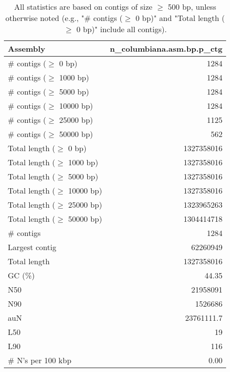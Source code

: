 \documentclass[12pt,a4paper]{article}
\begin{document}
\begin{table}[ht]
\begin{center}
\caption{All statistics are based on contigs of size $\geq$ 500 bp, unless otherwise noted (e.g., "\# contigs ($\geq$ 0 bp)" and "Total length ($\geq$ 0 bp)" include all contigs).}
\begin{tabular}{|l*{1}{|r}|}
\hline
Assembly & n\_columbiana.asm.bp.p\_ctg \\ \hline
\# contigs ($\geq$ 0 bp) & 1284 \\ \hline
\# contigs ($\geq$ 1000 bp) & 1284 \\ \hline
\# contigs ($\geq$ 5000 bp) & 1284 \\ \hline
\# contigs ($\geq$ 10000 bp) & 1284 \\ \hline
\# contigs ($\geq$ 25000 bp) & 1125 \\ \hline
\# contigs ($\geq$ 50000 bp) & 562 \\ \hline
Total length ($\geq$ 0 bp) & 1327358016 \\ \hline
Total length ($\geq$ 1000 bp) & 1327358016 \\ \hline
Total length ($\geq$ 5000 bp) & 1327358016 \\ \hline
Total length ($\geq$ 10000 bp) & 1327358016 \\ \hline
Total length ($\geq$ 25000 bp) & 1323965263 \\ \hline
Total length ($\geq$ 50000 bp) & 1304414718 \\ \hline
\# contigs & 1284 \\ \hline
Largest contig & 62260949 \\ \hline
Total length & 1327358016 \\ \hline
GC (\%) & 44.35 \\ \hline
N50 & 21958091 \\ \hline
N90 & 1526686 \\ \hline
auN & 23761111.7 \\ \hline
L50 & 19 \\ \hline
L90 & 116 \\ \hline
\# N's per 100 kbp & 0.00 \\ \hline
\end{tabular}
\end{center}
\end{table}
\end{document}
